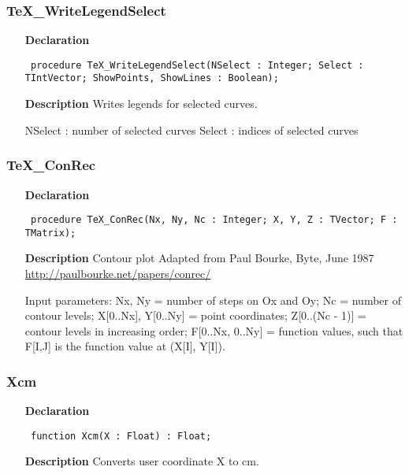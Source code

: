 \documentclass[12pt,a4paper,oneside]{report}
\newcommand{\declarationitem}[1]{\textbf{#1}}
\newcommand{\descriptiontitle}[1]{\textbf{#1}}
\newcommand{\code}[1]{\texttt{#1}}
\begin{document}
\subsubsection{TeX{\_}WriteLegendSelect}
\label{utexplot-TeX_WriteLegendSelect}
\begin{itemize}\item[\declarationitem{Declaration}\hfill]
	\begin{flushleft}
		\code{
			procedure TeX{\_}WriteLegendSelect(NSelect : Integer; Select : TIntVector; ShowPoints, ShowLines : Boolean);}
		
	\end{flushleft}
	
	\par
	\item[\descriptiontitle{Description}]
	Writes legends for selected curves.
	
	NSelect : number of selected curves Select : indices of selected curves
	
\end{itemize}
\subsubsection{TeX{\_}ConRec}
\label{utexplot-TeX_ConRec}
\begin{itemize}\item[\declarationitem{Declaration}\hfill]
	\begin{flushleft}
		\code{
			procedure TeX{\_}ConRec(Nx, Ny, Nc : Integer; X, Y, Z : TVector; F : TMatrix);}
		
	\end{flushleft}
	
	\par
	\item[\descriptiontitle{Description}]
	Contour plot Adapted from Paul Bourke, Byte, June 1987\\ \href{http://paulbourke.net/papers/conrec/}{http://paulbourke.net/papers/conrec/}
	
	Input parameters: Nx, Ny = number of steps on Ox and Oy; Nc = number of contour levels; X[0..Nx], Y[0..Ny] = point coordinates; Z[0..(Nc {-} 1)] = contour levels in increasing order; F[0..Nx, 0..Ny] = function values, such that F[I,J] is the function value at (X[I], Y[I]).
	
\end{itemize}
\subsubsection{Xcm}
\label{utexplot-Xcm}
\begin{itemize}\item[\declarationitem{Declaration}\hfill]
	\begin{flushleft}
		\code{
			function Xcm(X : Float) : Float;}
		
	\end{flushleft}
	
	\par
	\item[\descriptiontitle{Description}]
	Converts user coordinate X to cm.
	
\end{itemize}
\end{document}
